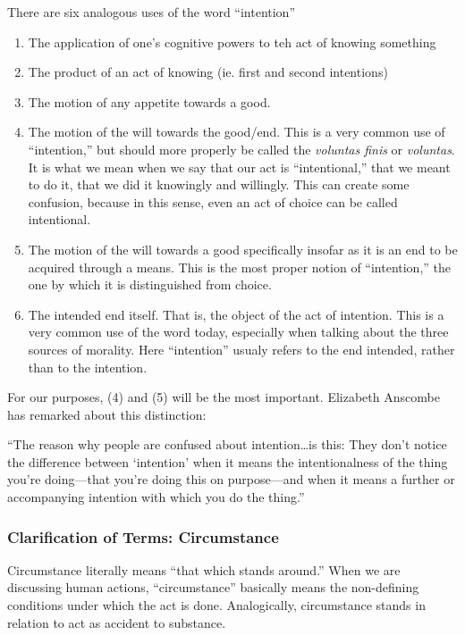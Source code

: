 \documentclass{article}
\begin{document}
There are six analogous uses of the word ``intention''

\begin{enumerate}

    \item  The application of one's cognitive powers to teh act of knowing something
    \item  The product of an act of knowing (ie. first and second intentions)
    \item  The motion of any appetite towards a good.
    \item  The motion of the will towards the good/end.  This is a very common use of ``intention,'' but should more
                properly be called the \emph{voluntas finis} or \emph{voluntas}.  It is what we mean when we say that our act is
                ``intentional,'' that we meant to do it, that we did it knowingly and willingly.  This can create some
                confusion, because in this sense, even an act of choice can be called intentional.
    \item  The motion of the will towards a good specifically insofar as it is an end to be acquired through a means.
                This is the most proper notion of ``intention,'' the one by which it is distinguished from choice.
    \item  The intended end itself.  That is, the object of the act of intention.  This is a very common use of the word
                today, especially when talking about the three sources of morality.  Here ``intention'' usualy refers to
                the end intended, rather than to the intention.

\end{enumerate}

For our purposes, (4) and (5) will be the most important.  Elizabeth Anscombe has remarked about this distinction: 

``The reason why people are confused about intention\ldots is this: They don't notice the difference between `intention'
when it means the intentionalness of the thing you're doing---that you're doing this on purpose---and when it means a
further or accompanying intention with which you do the thing.''

\subsubsection{Clarification of Terms: Circumstance}

Circumstance literally means ``that which stands around.'' When we are discussing human actions, ``circumstance''
basically means the non-defining conditions under which the act is done. Analogically, circumstance stands in relation
to act as accident to substance.
\end{document}
